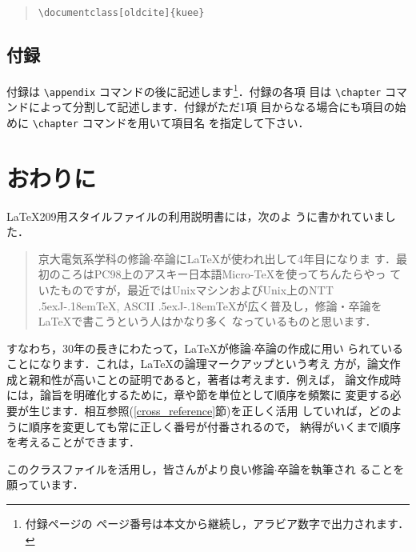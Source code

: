\documentclass{kuee}
\def\JTeX{\leavevmode\lower.5ex\hbox{J}\kern-.18em\TeX}
\begin{document}
\begin{quote}
\begin{verbatim}
\documentclass[oldcite]{kuee}
\end{verbatim}
\end{quote}

\section{付録}

付録は \verb+\appendix+ コマンドの後に記述します\footnote{付録ページの
ページ番号は本文から継続し，アラビア数字で出力されます．}．付録の各項
目は \verb+\chapter+ コマンドによって分割して記述します．付録がただ1項
目からなる場合にも項目の始めに \verb+\chapter+ コマンドを用いて項目名
を指定して下さい．


\chapter{おわりに}
\label{chap:conclusion}

\LaTeX{}209用スタイルファイルの利用説明書\cite{OldTebiki}には，次のよ
うに書かれていました．
\begin{quote}
  京大電気系学科の修論$\cdot$卒論に\LaTeX が使われ出して4年目になりま
  す．最初のころはPC98上のアスキー日本語Micro-\TeX を使ってちんたらやっ
  ていたものですが，最近ではUnixマシンおよびUnix上のNTT \JTeX, ASCII
  \JTeX が広く普及し，修論・卒論を\LaTeX で書こうという人はかなり多く
  なっているものと思います．
\end{quote}
すなわち，30年の長きにわたって，\LaTeX{}が修論$\cdot$卒論の作成に用い
られていることになります．これは，\LaTeX{}の論理マークアップという考え
方が，論文作成と親和性が高いことの証明であると，著者は考えます．例えば，
論文作成時には，論旨を明確化するために，章や節を単位として順序を頻繁に
変更する必要が生じます．相互参照(\ref{cross_reference}節)を正しく活用
していれば，どのように順序を変更しても常に正しく番号が付番されるので，
納得がいくまで順序を考えることができます．

このクラスファイルを活用し，皆さんがより良い修論$\cdot$卒論を執筆され
ることを願っています．
\end{document}
